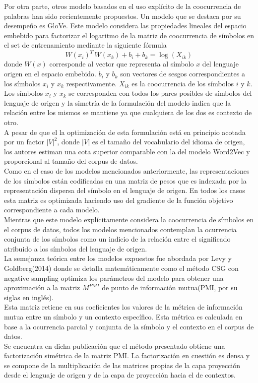 \documentclass{article}
\begin{document}
	Por otra parte, otros modelo basados en el uso explícito de la coocurrencia de palabras han sido recientemente propuestos\cite{39GlovePennington}. Un modelo que se destaca por su desempeño es GloVe\cite{45WordEmbbedingComparison}. Este modelo considera las propiedades lineales del espacio embebido para factorizar el logaritmo de la matriz de coocurrencia de símbolos en el set de entrenamiento mediante la siguiente fórmula
	\begin{equation*}
	W(x_i)^T \, W(x_k) + b_i + b_k = \log(X_{ik})
	\end{equation*}
	donde $W(x)$ corresponde al vector que representa al símbolo $x$ del lenguaje origen en el espacio embebido. $b_i$ y $b_k$ son vectores de sesgos correspondientes a los símbolos $x_i$ y $x_k$ respectivamente. $X_{ik}$ es la coocurrencia de los símbolos $i$ y $k$. Los símbolos $x_i$ y $x_k$ se corresponden con todos los pares posibles de símbolos del lenguaje de origen y la simetría de la formulación del modelo indica que la relación entre los mismos se mantiene ya que cualquiera de los dos es contexto de otro.\\
	A pesar de que el la optimización de esta formulación está en principio acotada por un factor $|V|^2$, donde $|V|$ es el tamaño del vocabulario del idioma de origen, los autores estiman una cota superior comparable con la del modelo Word2Vec y proporcional al tamaño del corpus de datos.\\
	Como en el caso de los modelos mencionados anteriormente, las representaciones de los símbolos están codificadas en una matriz de pesos que es indexada por la representación dispersa del símbolo en el lenguaje de origen. En todos los casos esta matriz es optimizada haciendo uso del gradiente de la función objetivo correspondiente a cada modelo.\\
	Mientras que este modelo explícitamente considera la coocurrencia de símbolos en el corpus de datos, todos los modelos mencionados contemplan la ocurrencia conjunta de los símbolos como un indicio de la relación entre el significado atribuido a los símbolos del lenguaje de origen.\\
	
	La semejanza teórica entre los modelos expuestos fue abordada por Levy y Goldberg(2014)\cite{60TeoricCorrespondenceOfWordEmbeddings} donde se detalla matemáticamente como el método CSG con negative sampling optimiza los parámetros del modelo para obtener una aproximación a la matriz $M^{PMI}$ de punto de información mutua(PMI, por su siglas en inglés)\cite{61PointMutualInformation}.\\
	Esta matriz retiene en sus coeficientes los valores de la métrica de información mutua entre un símbolo y un contexto específico. Esta métrica es calculada en base a la ocurrencia parcial y conjunta de la símbolo y el contexto en el corpus de datos.\\
	Se encuentra en dicha publicación que el método presentado obtiene una factorización simétrica de la matriz PMI. La factorización en cuestión es densa y se compone de la multiplicación de las matrices propias de la capa proyección desde el lenguaje de origen y de la capa de proyección hacia el de contextos.\\
	
\end{document}
